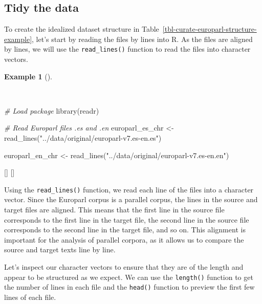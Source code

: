 \documentclass[
  letterpaper,
  krantz1]{latex/krantz-mod}
\newenvironment{Shaded}{\begin{snugshade}}{\end{snugshade}}
\newcommand{\CommentTok}[1]{\textcolor[rgb]{0.00,0.00,0.00}{\textit{#1}}}
\newcommand{\FunctionTok}[1]{\textcolor[rgb]{0.00,0.00,0.00}{#1}}
\newcommand{\NormalTok}[1]{\textcolor[rgb]{0.00,0.00,0.00}{#1}}
\newcommand{\OtherTok}[1]{\textcolor[rgb]{0.00,0.00,0.00}{#1}}
\newcommand{\StringTok}[1]{\textcolor[rgb]{0.00,0.00,0.00}{#1}}
\newcommand{\cindex}[1]{%
  \StrSubstitute{#1}{_}{\_}[\temp]%
  \index{\temp}%
}
\theoremstyle{definition}
\theoremstyle{definition}
\newtheorem{example}{Example}[chapter]
\theoremstyle{remark}
\begin{document}
\subsection{Tidy the data}\label{tidy-the-data}

To create the idealized dataset structure in
Table~\ref{tbl-curate-europarl-structure-example}, let's start by
reading the files by lines into R. As the files are aligned by lines, we
will use the \texttt{read\_lines()} function to read the files into
character vectors.

\begin{example}[]\protect\hypertarget{exm-curate-europarl-readr}{}\label{exm-curate-europarl-readr}

~

\begin{Shaded}
\begin{Highlighting}[numbers=left,,]
\CommentTok{\# Load package}
\FunctionTok{library}\NormalTok{(readr)}

\CommentTok{\# Read Europarl files .es and .en}
\NormalTok{europarl\_es\_chr }\OtherTok{\textless{}{-}}
  \FunctionTok{read\_lines}\NormalTok{(}\StringTok{"../data/original/europarl{-}v7.es{-}en.es"}\NormalTok{)}

\NormalTok{europarl\_en\_chr }\OtherTok{\textless{}{-}}
  \FunctionTok{read\_lines}\NormalTok{(}\StringTok{"../data/original/europarl{-}v7.es{-}en.en"}\NormalTok{)}
\end{Highlighting}
\end{Shaded}

\cindex{library()}\cindex{read_lines()}

\end{example}

Using the \texttt{read\_lines()} function, we read each line of the
files into a character vector. Since the Europarl corpus is a parallel
corpus, the lines in the source and target files are aligned. This means
that the first line in the source file corresponds to the first line in
the target file, the second line in the source file corresponds to the
second line in the target file, and so on. This alignment is important
for the analysis of parallel corpora, as it allows us to compare the
source and target texts line by line.

Let's inspect our character vectors to ensure that they are of the
length and appear to be structured as we expect. We can use the
\texttt{length()} function to get the number of lines in each file and
the \texttt{head()} function to preview the first few lines of each
file.
\end{document}
